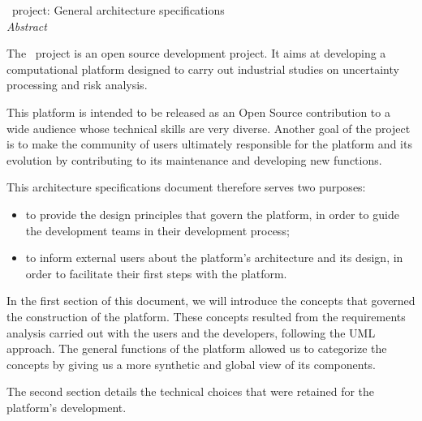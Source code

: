         \vspace{0.5in}
        \begin{center}
         \large \centering
        \OT\ project: General architecture specifications \\
        \vspace{0.3in}
        \emph{ Abstract}
        \vspace{0.5in}
        \end{center}

        The \OT\ project is an open source development project. It aims at developing a computational platform designed to carry out industrial studies on uncertainty processing and risk analysis.

        This platform is intended to be released as an Open Source contribution to a wide audience whose technical skills are very diverse. Another goal of the project is to make the community of users ultimately responsible for the platform and its evolution by contributing to its maintenance and developing new functions.

        This architecture specifications document therefore serves two purposes:
        \begin{itemize}
        \item to provide the design principles that govern the platform, in order to guide the development teams in their development process;
        \item to inform external users about the platform's architecture and its design, in order to facilitate their first steps with the platform.
        \end{itemize}

        In the first section of this document, we will introduce the concepts that governed the construction of the platform. These concepts resulted from the requirements analysis carried out with the users and the developers, following the UML approach. The general functions of the platform allowed us to categorize the concepts by giving us a more synthetic and global view of its components.


        The second section details the technical choices that were retained for the platform's development.

